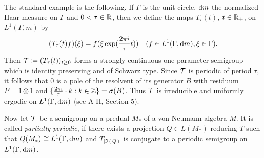 The standard example is the following.
If $ \Gamma $  is the unit circle, $ \mathop{}\!\mathrm{d}{m} $  the normalized Haar measure on $ \Gamma $  and $ 0 < \tau \in \mathbb{R} $, then we define the maps $ T_{\tau}(t) $, $ t \in \mathbb{R}_{+} $, on $ L^{1}(\Gamma,m) $  by
\[
(T_{\tau}(t)f)(\xi) = f(\xi\exp(\frac{2\pi i}{\tau}t)) \quad (f \in L^{1}(\Gamma,\mathop{}\!\mathrm{d}{m}), \xi \in \Gamma).
\]
Then $ \mathcal{T} \coloneqq (T_{\tau}(t))_{t \geq 0} $  forms a strongly continuous one parameter semigroup which is identity preserving and of Schwarz type.
Since $ \mathcal{T} $  is periodic of period $ \tau $, it follows that 0 is a pole of the resolvent of its generator $ B $  with residuum $ P = 1 \otimes 1 $  and $ \{\frac{2\pi \mathrm{i}}{\tau} \cdot k: k \in \mathbb{Z}\} = \sigma(B) $.
Thus $ \mathcal{T} $  is irreducible and uniformly ergodic on $ L^{1}(\Gamma,\mathop{}\!\mathrm{d}{m}) $  (see A-II, Section 5).

Now let $ \mathcal{T} $  be a semigroup on a predual $ M_{*} $ of a von Neumann-algebra $ M $.
It is called \emph{partially periodic}, if there exists a projection $ Q \in L(M_{*}) $  reducing $ T $  such that $ Q(M_{*}) \cong L^{1}(\Gamma,\mathop{}\!\mathrm{d}{m}) $  and $ T_{| \Im(Q)} $  is conjugate to a periodic semigroup on $ L^{1}(\Gamma,\mathop{}\!\mathrm{d}{m}) $.


